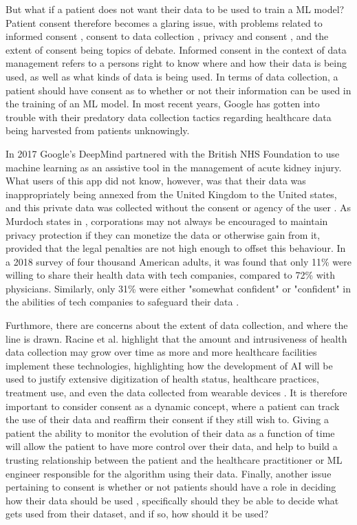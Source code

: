 \documentclass[12pt]{article}
\begin{document}
But what if a patient does not want their data to be used to train a ML model? Patient consent therefore becomes a glaring issue, with problems related to informed consent \citep{Gerke_2020,Guan_2019}, consent to data collection \citep{Gerke_2020,Ali_2023,Murdoch_2021}, privacy and consent \citep{Murdoch_2021}, and the extent of consent \citep{Racine_2019,Price_2019} being topics of debate. Informed consent in the context of data management refers to a persons right to know where and how their data is being used, as well as what kinds of data is being used. In terms of data collection, a patient should have consent as to whether or not their information can be used in the training of an ML model. In most recent years, Google has gotten into trouble with their predatory data collection tactics regarding healthcare data being harvested from patients unknowingly.\

In 2017 Google's DeepMind partnered with the British NHS Foundation to use machine learning as an assistive tool in the management of acute kidney injury. What users of this app did not know, however, was that their data was inappropriately being annexed from the United Kingdom to the United states, and this private data was collected without the consent or agency of the user \citep{Gerke_2020,Murdoch_2021}. As Murdoch states in \citep{Murdoch_2021}, corporations may not always be encouraged to maintain privacy protection if they can monetize the data or otherwise gain from it, provided that the legal penalties are not high enough to offset this behaviour. In a 2018 survey of four thousand American adults, it was found that only 11\% were willing to share their health data with tech companies, compared to 72\% with physicians. Similarly, only 31\% were either "somewhat confident" or "confident" in the abilities of tech companies to safeguard their data \citep{Murdoch_2021}.\

Furthmore, there are concerns about the extent of data collection, and where the line is drawn. Racine et al. highlight that the amount and intrusiveness of health data collection may grow over time as more and more healthcare facilities implement these technologies, highlighting how the development of AI will be used to justify extensive digitization of health status, healthcare practices, treatment use, and even the data collected from wearable devices \citep{Racine_2019}. It is therefore important to consider consent as a dynamic concept, where a patient can track the use of their data and reaffirm their consent if they still wish to. Giving a patient the ability to monitor the evolution of their data as a function of time will allow the patient to have more control over their data, and help to build a trusting relationship between the patient and the healthcare practitioner or ML engineer responsible for the algorithm using their data. Finally, another issue pertaining to consent is whether or not patients should have a role in deciding how their data should be used \citep{Price_2019}, specifically should they be able to decide what gets used from their dataset, and if so, how should it be used?
\end{document}
